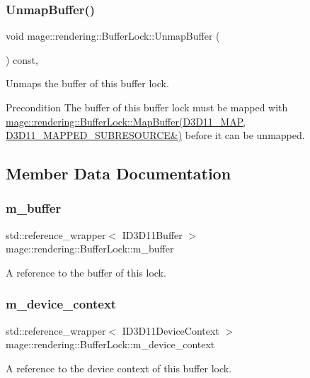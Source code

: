 \subsubsection{\texorpdfstring{Unmap\+Buffer()}{UnmapBuffer()}}
{\footnotesize\ttfamily void mage\+::rendering\+::\+Buffer\+Lock\+::\+Unmap\+Buffer (\begin{DoxyParamCaption}{ }\end{DoxyParamCaption}) const\hspace{0.3cm}{\ttfamily [private]}, {\ttfamily [noexcept]}}

Unmaps the buffer of this buffer lock.

\begin{DoxyPrecond}{Precondition}
The buffer of this buffer lock must be mapped with \hyperlink{classmage_1_1rendering_1_1_buffer_lock_a88693ae3717c7098d5cc2313cd16b8a6}{mage\+::rendering\+::\+Buffer\+Lock\+::\+Map\+Buffer(\+D3\+D11\+\_\+\+M\+A\+P, D3\+D11\+\_\+\+M\+A\+P\+P\+E\+D\+\_\+\+S\+U\+B\+R\+E\+S\+O\+U\+R\+C\+E\&)} before it can be unmapped. 
\end{DoxyPrecond}


\subsection{Member Data Documentation}
\hypertarget{classmage_1_1rendering_1_1_buffer_lock_ae3e40fcda48227f62eb63611cad1a507}{}\label{classmage_1_1rendering_1_1_buffer_lock_ae3e40fcda48227f62eb63611cad1a507} 
\subsubsection{\texorpdfstring{m\+\_\+buffer}{m\_buffer}}
{\footnotesize\ttfamily std\+::reference\+\_\+wrapper$<$ I\+D3\+D11\+Buffer $>$ mage\+::rendering\+::\+Buffer\+Lock\+::m\+\_\+buffer\hspace{0.3cm}{\ttfamily [private]}}

A reference to the buffer of this lock. \hypertarget{classmage_1_1rendering_1_1_buffer_lock_afa41d2028ffcffd11f7e17ae505d1e93}{}\label{classmage_1_1rendering_1_1_buffer_lock_afa41d2028ffcffd11f7e17ae505d1e93} 
\subsubsection{\texorpdfstring{m\+\_\+device\+\_\+context}{m\_device\_context}}
{\footnotesize\ttfamily std\+::reference\+\_\+wrapper$<$ I\+D3\+D11\+Device\+Context $>$ mage\+::rendering\+::\+Buffer\+Lock\+::m\+\_\+device\+\_\+context\hspace{0.3cm}{\ttfamily [private]}}

A reference to the device context of this buffer lock. 